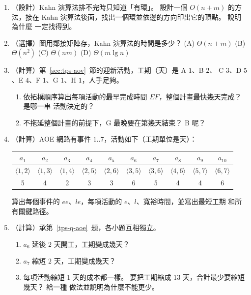 \begin{enumerate}
\item \label{tps-q-cycle}（設計）Kahn 演算法排不完時只知道「有環」。 設計一個
$O(n + m)$ 的方法，接在 Kahn 演算法後面，找出一個環並依邊的方向印出它的頂點。 說明為什麼
一定找得到。

\item \label{tps-q-matrix}（選擇）圖用鄰接矩陣存，Kahn 演算法的時間是多少？ \quad
(A) $\Theta(n + m)$ \quad (B) $\Theta(n^2)$ \quad (C) $\Theta(nm)$ \quad
(D) $\Theta(m \lg n)$

\item \label{tps-q-aov}（計算）第~\ref{sec:tps-aov}~節的迎新活動，工期（天）是 A $1$、B $2$、
C $3$、D $5$、E $4$、F $1$、G $1$、H $1$，人手足夠。
\begin{enumerate}
\item 依拓樸順序算出每項活動的最早完成時間 $\mathit{EF}$，整個計畫最快幾天完成？ 是哪一串
活動決定的？
\item 不拖延整個計畫的前提下，G 最晚要在第幾天結束？ B 呢？
\end{enumerate}

\item \label{tps-q-aoe}（計算）AOE 網路有事件 $1..7$，活動如下（工期單位是天）：
\begin{center}
\begin{tabular}{*{10}{c}}
\toprule
$a_1$ & $a_2$ & $a_3$ & $a_4$ & $a_5$ & $a_6$ & $a_7$ & $a_8$ & $a_9$ & $a_{10}$ \\
\midrule
$\langle 1, 2 \rangle$ & $\langle 1, 3 \rangle$ & $\langle 1, 4 \rangle$ & $\langle 2, 5 \rangle$ &
$\langle 2, 6 \rangle$ & $\langle 3, 5 \rangle$ & $\langle 3, 6 \rangle$ & $\langle 4, 6 \rangle$ &
$\langle 5, 7 \rangle$ & $\langle 6, 7 \rangle$ \\
5 & 4 & 2 & 3 & 3 & 6 & 5 & 4 & 4 & 6 \\
\bottomrule
\end{tabular}
\end{center}
算出每個事件的 $\mathit{ee}$、$\mathit{le}$，每項活動的 $e$、$l$、寬裕時間，並寫出最短工期
和所有關鍵路徑。

\item \label{tps-q-aoe2}（計算）承第~\ref{tps-q-aoe}~題，各小題互相獨立。
\begin{enumerate}
\item $a_6$ 延後 $2$ 天開工，工期變成幾天？
\item $a_7$ 縮短 $2$ 天，工期變成幾天？
\item 每項活動縮短 $1$ 天的成本都一樣。 要把工期縮成 $13$ 天，合計最少要縮短幾天？ 給一種
做法並說明為什麼不能更少。
\end{enumerate}


\end{enumerate}
